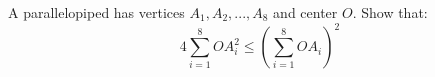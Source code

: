 A parallelopiped has vertices $A_1, A_2, ... , A_8$ and center $O$. Show that:
\[ 4 \sum_{i=1}^8 OA_i ^2 \leq \left(\sum_{i=1}^8 OA_i \right) ^2  \]